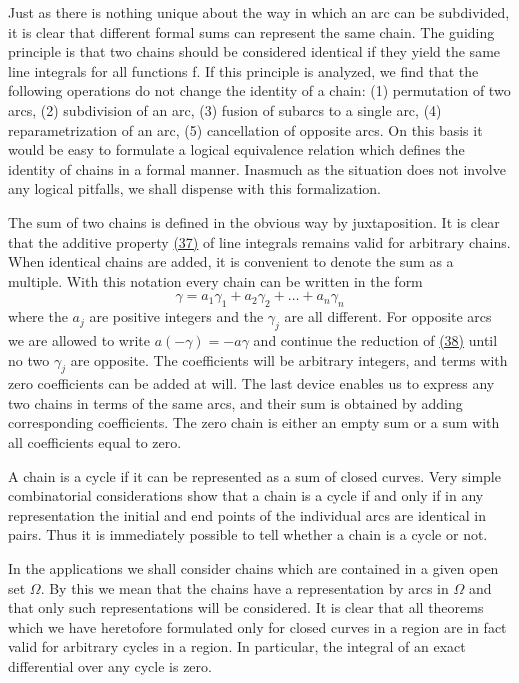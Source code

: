 Just as there is nothing unique about the way in which an arc can be subdivided, it is clear that different formal sums can represent the same chain. The guiding principle is that two chains should be considered identical if they yield the same line integrals for all functions f. If this principle is analyzed, we find that the following operations do not change the identity of a chain: (1) permutation of two arcs, (2) subdivision of an arc, (3) fusion of subarcs to a single arc, (4) reparametrization of an arc, (5) cancellation of opposite arcs. On this basis it would be easy to
formulate a logical equivalence relation which defines the identity of chains in a formal manner. Inasmuch as the situation does not involve any logical pitfalls, we shall dispense with this formalization.

The sum of two chains is defined in the obvious way by juxtaposition. It is clear that the additive property \hyperref[eq:4.37]{(37)} of line integrals remains valid for arbitrary chains. When identical chains are added, it is convenient to denote the sum as a multiple. With this notation every chain can be written in the form
\begin{equation*}
\gamma = a _ {1} \gamma_ {1} + a _ {2} \gamma_ {2} + \dots + a _ {n} \gamma_ {n}\tag{38}\label{eq:4.38}
\end{equation*}
where the $a_{j}$ are positive integers and the $\gamma_{j}$ are all different. For opposite arcs we are allowed to write $a(-\gamma) = -a\gamma$ and continue the reduction of \hyperref[eq:4.38]{(38)} until no two $\gamma_{j}$ are opposite. The coefficients will be arbitrary integers, and terms with zero coefficients can be added at will. The last device enables us to express any two chains in terms of the same arcs, and their sum is obtained by adding corresponding coefficients. The zero chain is either an empty sum or a sum with all coefficients equal to zero.

A chain is a cycle if it can be represented as a sum of closed curves. Very simple combinatorial considerations show that a chain is a cycle if and only if in any representation the initial and end points of the individual arcs are identical in pairs. Thus it is immediately possible to tell whether a chain is a cycle or not.

In the applications we shall consider chains which are contained in a given open set $\Omega$. By this we mean that the chains have a representation by arcs in $\Omega$ and that only such representations will be considered. It is clear that all theorems which we have heretofore formulated only for closed curves in a region are in fact valid for arbitrary cycles in a region. In particular, the integral of an exact differential over any cycle is zero.

